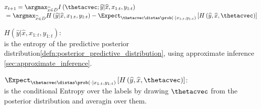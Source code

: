 \begin{defnbox}\nospacing
  \begin{defn}\label{defn:bald}\leavevmode\\
    \begin{align}
      &x_{t+1}=\argmax_{\widehat{x}\in D}I\left(\thetacvec;\widehat{y}|\widehat{x},x_{1:t},y_{1:t}\right)\\[-1\jot]
      &=\argmax_{\widehat{x}\in D}H\left(\widehat{y}|\widehat{x},x_{1:t},y_{1:t}\right)
         -\Expect_{\thetacvec\distas\prob(\cdot|x_{1:t},y_{1:t})}\left[H\left(\widehat{y},\widehat{x},\thetacvec\right)\right]\nonumber
    \end{align}
  \end{defn}
\end{defnbox}
\begin{explanationbox}
  \begin{explanation}\leavevmode
    \begin{circlelistnosep}
      \item $H\left(\widehat{y}|\widehat{x},x_{1:t},y_{1:t}\right)$:\\ is the entropy of
      the predictive posterior distribution\cref{defn:posterior_predictive_distribution},
       using approximate inference \cref{sec:approximate_inference}.
      \item $\Expect_{\thetacvec\distas\prob(\cdot|x_{1:t},y_{1:t})}\left[H\left(\widehat{y},\widehat{x},\thetacvec\right)\right]$:\\
      is the conditional Entropy over the labels by drawing $\thetacvec$ from the posterior distribution and averagin over them.
    \end{circlelistnosep}
  \end{explanation}
\end{explanationbox}
